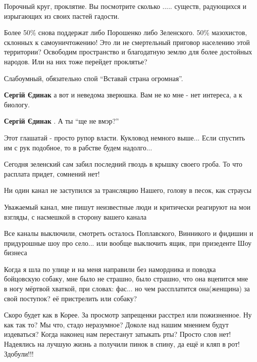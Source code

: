 \begin{itemize}

Порочный круг, проклятие. Вы посмотрите сколько ..... существ, радующихся и изрыгающих из своих пастей гадости.

Более 50\% снова поддержат либо Порошенко либо Зеленского. 50\% мазохистов,
склонных к самоуничтожению! Это ли не смертельный приговор населению этой
территории? Освободим пространство и благодатную землю для более достойных
народов. Или на них тоже перейдет проклятье?

\begin{itemize} %
Слабоумный, обязательно спой \enquote{Вставай страна огромная}.

\textbf{Сергій Єдинак} а вот и неведома зверюшка. Вам не ко мне - нет интереса, а к биологу.

\textbf{Сергій Єдинак} .
А ты \enquote{ще не вмэр?}
\end{itemize} %

Этот глашатай - просто рупор власти. Кукловод немного выше... Если спустить им с рук подобное, то в рабстве будем надолго...

Сегодня зеленский сам забил последний гвоздь в крышку своего гроба.
То что расплата придет, сомнений нет!

Ни один канал не заступился за трансляцию Нашего, голову в песок, как страусы

\begin{itemize} %

Уважаемый канал, мне пишут неизвестные люди и критически реагируют на мои
взгляды, с насмешкой в сторону вашего канала
\end{itemize} %


Все каналы выключили, смотреть осталось Поплавского, Винникого и фидишин и
придурошные шоу про село... или вообще выключить ящик, при призеденте Шоу
бизнеса


Когда я шла по улице и на меня направили без намордника и поводка бойцовскую
собаку, мне было не страшно, было страшно, что она вцепится мне в ногу мёртвой
хваткой, при словах: фас... но чем рассплатится она(женщина) за свой поступок?
её пристрелить или собаку?


Скоро будет как в Корее. За просмотр запрещенки расстрел или пожизненное. Ну как
так то? Мы что, стадо неразумное? Доколе над нашим мнением будут издеваться? Когда
наконец нам перестанут затыкать рты? Просто слов нет! Надеялись на лучшую жизнь а
получили пинок в спину, да ещё и кляп в рот! Здобули!!!


\end{itemize}
